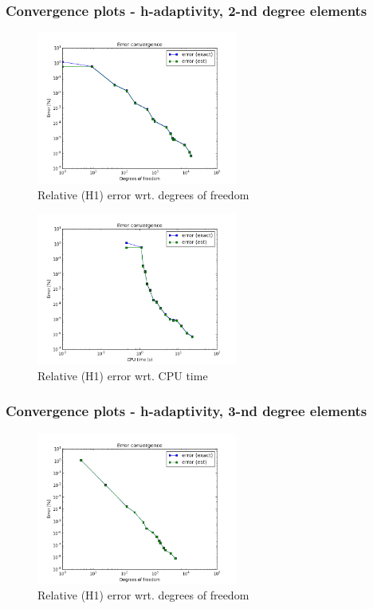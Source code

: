 		\subsubsection{Convergence plots - h-adaptivity, 2-nd degree elements}
			\begin{figure}[H]
				\centering
				\includegraphics[height=5cm]{img/sin-h2-dof.png}
				\caption{Relative (H1) error wrt. degrees of freedom}
			\end{figure}
			
			\begin{figure}[H]
				\centering
				\includegraphics[height=5cm]{img/sin-h2-cpu.png}
				\caption{Relative (H1) error wrt. CPU time}
			\end{figure}
			
		\subsubsection{Convergence plots - h-adaptivity, 3-nd degree elements}
			\begin{figure}[H]
				\centering
				\includegraphics[height=5cm]{img/sin-h3-dof.png}
				\caption{Relative (H1) error wrt. degrees of freedom}
			\end{figure}
			

